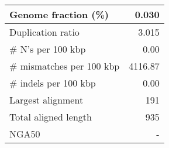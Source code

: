 \documentclass[12pt,a4paper]{article}
\begin{document}
\begin{table}[ht]
\begin{center}
\begin{tabular}{|l*{1}{|r}|}
Genome fraction (\%) & 0.030 \\ \hline
Duplication ratio & 3.015 \\ \hline
\# N's per 100 kbp & 0.00 \\ \hline
\# mismatches per 100 kbp & 4116.87 \\ \hline
\# indels per 100 kbp & 0.00 \\ \hline
Largest alignment & 191 \\ \hline
Total aligned length & 935 \\ \hline
NGA50 & - \\ \hline
\end{tabular}
\end{center}
\end{table}
\end{document}
